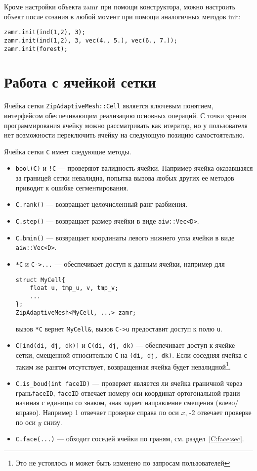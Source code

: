 \documentclass[12pt]{article}
\begin{document}
Кроме настройки объекта zamr при помощи конструктора, можно настроить объект после созания в любой момент при помощи аналогичных методов init:
\begin{verbatim}
zamr.init(ind(1,2), 3);
zamr.init(ind(1,2), 3, vec(4., 5.), vec(6., 7.));
zamr.init(forest);
\end{verbatim}

\section{Работа с ячейкой сетки}
Ячейка сетки \verb'ZipAdaptiveMesh::Cell' является ключевым понятием, интерфейсом обеспечивающим реализацию основных операций.  
С точки зрения программирования ячейку можно рассматривать как итератор, но у пользователя нет возможности переключить ячейку на следующую позицию самостоятельно.

Ячейка сетки \verb'C' имеет следующие методы.
\begin{itemize}
\item \verb'bool(C)' и \verb'!C' --- проверяют валидность ячейки. Например ячейка оказавшаяся за границей сетки невалидна, попытка вызова любых других ее методов
  приводит к ошибке сегментирования.
\item \verb'C.rank()' --- возвращает целочисленный ранг разбиения.
\item \verb'C.step()' --- возвращает размер ячейки в виде \verb'aiw::Vec<D>'.
\item \verb'C.bmin()' --- возвращает координаты левого нижнего угла ячейки в виде \verb'aiw::Vec<D>'.
\item \verb'*C' и \verb'C->...' --- обеспечивает доступ к данным ячейки, например для
\begin{verbatim}
struct MyCell{ 
    float u, tmp_u, v, tmp_v; 
    ...
};
ZipAdaptiveMesh<MyCell, ...> zamr;
\end{verbatim}
  вызов \verb'*C' вернет \verb'MyCell&', вызов \verb'C->u' предоставит доступ к полю \verb'u'.
\item \verb'C[ind(di, dj, dk)]' и \verb'C(di, dj, dk)' --- обеспечивает доступ к ячейке сетки, смещенной относительно \verb'C' на \verb'(di, dj, dk)'.
  Если соседняя ячейка с таким же рангом отсутствует, возвращенная ячейка будет невалидной\footnote{Это не устоялось и может быть изменено по запросам пользователей}.
\item \verb'C.is_boud(int faceID)' --- проверяет является ли ячейка граничной через грань\verb'faceID',  \verb'faceID'
  отвечает номеру оси координат ортогональной грани начиная с единицы со знаком,
  знак задает направление смещения (влево/вправо). Например 1 отвечает проверке справа по оси $x$, -2 отвечает проверке по оси $y$ снизу.
  \item \verb'C.face(...)' --- обходит соседей ячейки по граням, см. раздел~\ref{C:face:sec}.
\end{itemize}
\end{document}
